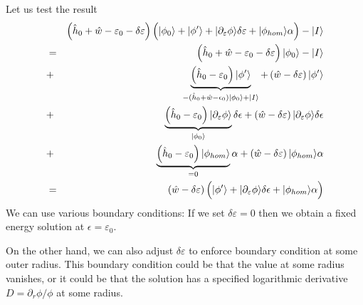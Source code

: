 \documentclass[11pt,a4paper]{report}
\begin{document}
Let us test the result
\begin{eqnarray*}
&&\left(\hat{h}_0+\hat{w}-\varepsilon_0-\delta\varepsilon\right)
\Bigl(|\phi_0\rangle+|\phi'\rangle
+|\partial_\varepsilon\phi\rangle\delta\varepsilon
+|\phi_{hom}\rangle\alpha\Bigr)-|I\rangle
\\
&=&\left(\hat{h}_0+\hat{w}-\varepsilon_0-\delta\varepsilon\right)|\phi_0\rangle
-|I\rangle
\\
&+&
\underbrace{\left(\hat{h}_0-\varepsilon_0\right)|\phi'\rangle}
_{-(\hat{h}_0+\hat{w}-\epsilon_0)|\phi_0\rangle+|I\rangle}
+\left(\hat{w}-\delta\varepsilon\right)|\phi'\rangle
\\
&+&
\underbrace{\left(\hat{h}_0-\varepsilon_0\right)
|\partial_\varepsilon\phi\rangle}_{|\phi_0\rangle}\delta\epsilon
+\left(\hat{w}-\delta\varepsilon\right)
|\partial_\varepsilon\phi\rangle\delta\epsilon
\\
&+&
\underbrace{\left(\hat{h}_0-\varepsilon_0\right)
|\phi_{hom}\rangle}_{=0}\alpha
+\left(\hat{w}-\delta\varepsilon\right)
|\phi_{hom}\rangle\alpha
\\
&=&
\left(\hat{w}-\delta\varepsilon\right)
\Bigl(|\phi'\rangle
+|\partial_\varepsilon\phi\rangle\delta\epsilon
+|\phi_{hom}\rangle\alpha\Bigr)
\end{eqnarray*}
We can use various boundary conditions: If we set
$\delta\varepsilon=0$ then we obtain a fixed energy solution at
$\epsilon=\varepsilon_0$. 


On the other hand, we can also adjust $\delta\varepsilon$ to enforce
boundary condition at some outer radius. This boundary condition could
be that the value at some radius vanishes, or it could be that the
solution has a specified logarithmic derivative
$D=\partial_r\phi/\phi$ at some radius.
\end{document}
